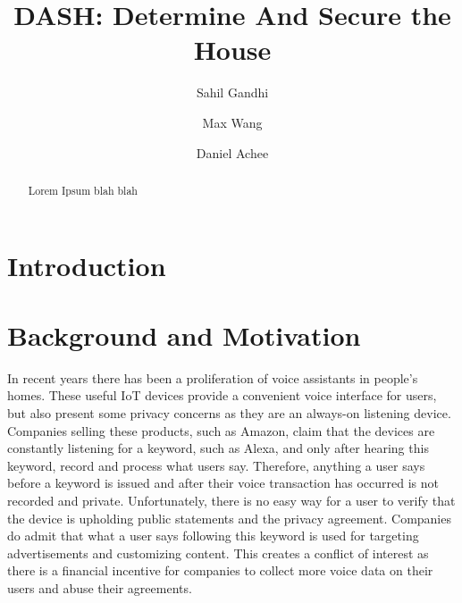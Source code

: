 \documentclass[sigconf]{acmart}
\begin{document}
\thispagestyle{empty}

\title{DASH: Determine And Secure the House}

\author{Sahil Gandhi}
\author{Max Wang}
\authornotemark[1]
\author{Daniel Achee}
\authornotemark[1]

\begin{abstract}
  Lorem Ipsum blah blah 
\end{abstract}



\maketitle

\section{Introduction}

\section{Background and Motivation}
In recent years there has been a proliferation of voice assistants in people’s homes. These useful IoT devices provide a convenient voice interface for users, but also present some privacy concerns as they are an always-on listening device. Companies selling these products, such as Amazon, claim that the devices are constantly listening for a keyword, such as Alexa, and only after hearing this keyword, record and process what users say. Therefore, anything a user says before a keyword is issued and after their voice transaction has occurred is not recorded and private. Unfortunately, there is no easy way for a user to verify that the device is upholding public statements and the privacy agreement. Companies do admit that what a user says following this keyword is used for targeting advertisements and customizing content. This creates a conflict of interest as there is a financial incentive for companies to collect more voice data on their users and abuse their agreements.
\end{document}
